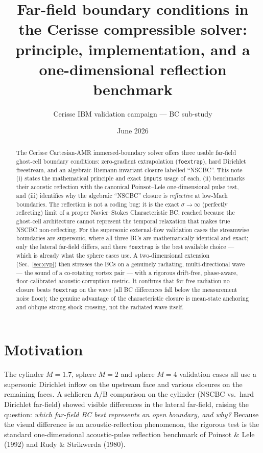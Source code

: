 \documentclass[11pt]{article}
\title{\textbf{Far-field boundary conditions in the Cerisse compressible solver:\\
principle, implementation, and a one-dimensional reflection benchmark}}
\author{Cerisse IBM validation campaign --- BC sub-study}
\date{June 2026}
\begin{document}
\maketitle

\begin{abstract}
\noindent
The Cerisse Cartesian-AMR immersed-boundary solver offers three usable
far-field ghost-cell boundary conditions: zero-gradient extrapolation
(\texttt{foextrap}), hard Dirichlet freestream, and an algebraic
Riemann-invariant closure labelled ``NSCBC''. This note (i) states the
mathematical principle and exact \texttt{inputs} usage of each, (ii) benchmarks
their acoustic reflection with the canonical Poinsot--Lele one-dimensional
pulse test, and (iii) identifies why the algebraic ``NSCBC'' closure is
\emph{reflective} at low-Mach boundaries. The reflection is not a coding bug:
it is the exact $\sigma\!\to\!\infty$ (perfectly reflecting) limit of a proper
Navier--Stokes Characteristic BC, reached because the ghost-cell architecture
cannot represent the temporal relaxation that makes true NSCBC non-reflecting.
For the supersonic external-flow validation cases the streamwise boundaries are
supersonic, where all three BCs are mathematically identical and exact; only the
lateral far-field differs, and there \texttt{foextrap} is the best available
choice --- which is already what the sphere cases use. A two-dimensional
extension (Sec.~\ref{sec:cvp}) then stresses the BCs on a genuinely radiating,
multi-directional wave --- the sound of a co-rotating vortex pair --- with a
rigorous drift-free, phase-aware, floor-calibrated acoustic-corruption metric.
It confirms that for free radiation no closure beats \texttt{foextrap} on the
wave (all BC differences fall below the measurement noise floor); the genuine
advantage of the characteristic closure is mean-state anchoring and oblique
strong-shock crossing, not the radiated wave itself.
\end{abstract}

\section{Motivation}
The cylinder $M{=}1.7$, sphere $M{=}2$ and sphere $M{=}4$ validation cases all
use a supersonic Dirichlet inflow on the upstream face and various closures on
the remaining faces. A schlieren A/B comparison on the cylinder
(NSCBC vs.\ hard Dirichlet far-field) showed visible differences in the
lateral far-field, raising the question: \emph{which far-field BC best
represents an open boundary, and why?} Because the visual difference is an
acoustic-reflection phenomenon, the rigorous test is the standard
one-dimensional acoustic-pulse reflection benchmark of
Poinsot \& Lele (1992) and Rudy \& Strikwerda (1980).
\end{document}
